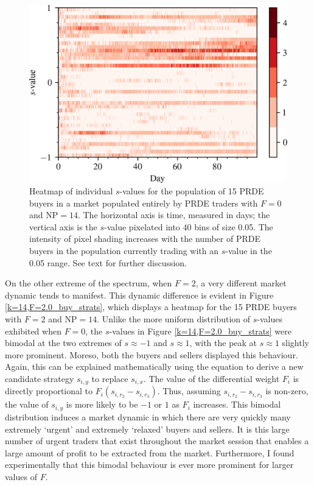 \documentclass[a4paper,twoside]{article}
\begin{document}
\begin{figure}[htbp]
    \centerline{\includegraphics[width=\columnwidth]{k=14,F=0.0_buy_strats.png}}
    \caption{
        Heatmap of individual $s$-values for the population of 15 PRDE buyers in a market populated entirely by PRDE traders with $F=0$ and $\mathrm{NP}=14$.
        The horizontal axis is time, measured in days; the vertical axis is the $s$-value pixelated into 40 bins of size 0.05.
        The intensity of pixel shading increases with the number of PRDE buyers in the population currently trading with an $s$-value in the 0.05 range.
        See text for further discussion.
    }
    \label{k=14,F=0.0_buy_strats}
\end{figure}

On the other extreme of the spectrum, when $F=2$, a very different market dynamic tends to manifest.
This dynamic difference is evident in Figure \ref{k=14,F=2.0_buy_strats}, which displays a heatmap for the 15 PRDE buyers with $F=2$ and $\mathrm{NP}=14$.
Unlike the more uniform distribution of $s$-values exhibited when $F=0$, the $s$-values in Figure \ref{k=14,F=2.0_buy_strats} were bimodal at the two extremes of $s\approx-1$ and $s\approx1$, with the peak at $s\approx1$ slightly more prominent.
Moreso, both the buyers and sellers displayed this behaviour.
Again, this can be explained mathematically using the equation to derive a new candidate strategy $s_{i,y}$ to replace $s_{i,x}$.
The value of the differential weight $F_i$ is directly proportional to $F_i(s_{i,r_2}-s_{i,r_3})$.
Thus, assuming $s_{i,r_2}-s_{i,r_3}$ is non-zero, the value of $s_{i,y}$ is more likely to be $-1$ or $1$ as $F_i$ increases.
This bimodal distribution induces a market dynamic in which there are very quickly many extremely `urgent' and extremely `relaxed' buyers and sellers.
It is this large number of urgent traders that exist throughout the market session that enables a large amount of profit to be extracted from the market.
Furthermore, I found experimentally that this bimodal behaviour is ever more prominent for larger values of $F$.
\end{document}
